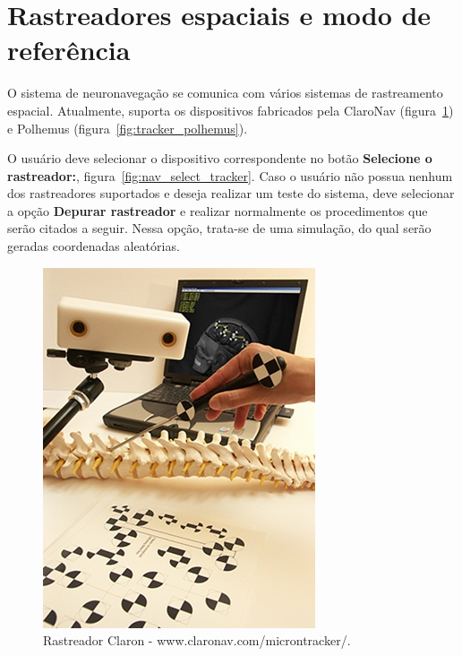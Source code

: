 \section{Rastreadores espaciais e modo de referência}

O sistema de neuronavegação se comunica com vários sistemas de rastreamento espacial. Atualmente, suporta os dispositivos fabricados pela ClaroNav (figura~\ref{fig:tracker_claron}) e Polhemus (figura~\ref{fig:tracker_polhemus}). 

O usuário deve selecionar o dispositivo correspondente no botão \textbf{Selecione o rastreador:}, figura~\ref{fig:nav_select_tracker}.  Caso o usuário não possua nenhum dos rastreadores suportados e deseja realizar um teste do sistema, deve selecionar a opção \textbf{Depurar rastreador} e realizar normalmente os procedimentos que serão citados a seguir. Nessa opção, trata-se de uma simulação, do qual serão geradas coordenadas aleatórias.

\begin{figure}[!htb]
\centering
\includegraphics[scale=0.4]{../user_guide_figures/tracker_claron.png}
\caption{Rastreador Claron - www.claronav.com/microntracker/.}
\label{fig:tracker_claron}
\end{figure}

